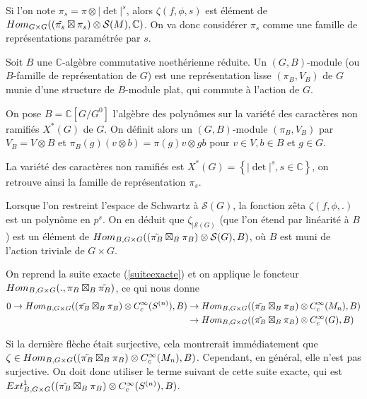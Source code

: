 Si l'on note $\pi_s = \pi \otimes |\det|^s$, alors $\zeta(f, \phi, s)$ est élément de $\operatorname{\mathnormal{Hom}}_{G \times G}((\tilde{\pi_s} \boxtimes \pi_s) \otimes \mathcal{S}(M), \mathbb{C})$. On va donc considérer $\pi_s$ comme une famille de représentations paramétrée par $s$.

\begin{definition}
Soit $B$ une $\mathbb{C}$-algèbre commutative noethérienne réduite. Un $(G, B)$-module (ou $B$-famille de représentation de $G$) est une représentation lisse $(\pi_B, V_B)$ de $G$ munie d'une structure de $B$-module plat, qui commute à l'action de $G$.
\end{definition}

On pose $B=\mathbb{C}[G/G^0]$ l'algèbre des polynômes sur la variété des caractères non ramifiés $X^*(G)$ de $G$. On définit alors un $(G,B)$-module $(\pi_B, V_B)$ par $V_B = V \otimes B$ et $\pi_B(g)(v \otimes b) = \pi(g)v \otimes gb$ pour $v \in V, b \in B$ et $g \in G$.

La variété des caractères non ramifiés est $X^*(G) = \left\lbrace |\det|^s, s \in \mathbb{C} \right\rbrace$, on retrouve ainsi la famille de représentation $\pi_s$.

Lorsque l'on restreint l'espace de Schwartz à $\mathcal{S}(G)$, la fonction zêta $\zeta(f, \phi, .)$ est un polynôme en $p^s$. On en déduit que $\zeta_{|\mathcal{S}(G)}$ (que l'on étend par linéarité à $B$) est un élément de $\operatorname{\mathnormal{Hom}}_{B, G \times G}((\tilde{\pi_B} \boxtimes_B \pi_B) \otimes \mathcal{S}(G), B)$, où $B$ est muni de l'action triviale de $G \times G$.

On reprend la suite exacte (\ref{suiteexacte}) et on applique le foncteur $\operatorname{\mathnormal{Hom}}_{B, G \times G} (., \pi_B \boxtimes_B \tilde{\pi_B})$, ce qui nous donne
\begin{equation}
\begin{split}
0 \rightarrow \operatorname{\mathnormal{Hom}}_{B, G \times G}((\tilde{\pi_B} \boxtimes_B \pi_B) \otimes C^\infty_c(S^{(n)}), B) &\rightarrow \operatorname{\mathnormal{Hom}}_{B, G \times G}((\tilde{\pi_B} \boxtimes_B \pi_B) \otimes C^\infty_c(M_n), B) \\
&\rightarrow \operatorname{\mathnormal{Hom}}_{B, G \times G}((\tilde{\pi_B} \boxtimes_B \pi_B) \otimes C^\infty_c(G), B)
\end{split}
\end{equation}

Si la dernière flèche était surjective, cela montrerait immédiatement que $\zeta \in \operatorname{\mathnormal{Hom}}_{B, G \times G}((\tilde{\pi_B} \boxtimes_B \pi_B) \otimes C^\infty_c(M_n), B)$. Cependant, en général, elle n'est pas surjective. On doit donc utiliser le terme suivant de cette suite exacte, qui est $\operatorname{\mathnormal{Ext}}^1_{B, G \times G}((\tilde{\pi_B} \boxtimes_B \pi_B) \otimes C^\infty_c(S^{(n)}), B)$.

